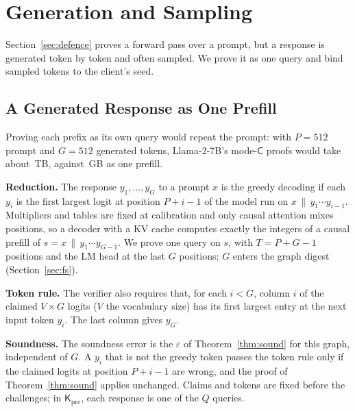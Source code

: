 \providecommand{\Kpre}{\mathsf{K}_{\mathrm{pre}}}
\providecommand{\sC}{\mathsf{C}}
\providecommand{\para}[1]{\par\noindent\textbf{#1}\quad}
\providecommand{\todo}[1]{\textbf{[TODO: #1]}}

\section{Generation and Sampling}
\label{sec:gen}

Section~\ref{sec:defence} proves a forward pass over a prompt, but a response is generated token by
token and often sampled. We prove it as one query and bind sampled tokens to the client's seed.

\subsection{A Generated Response as One Prefill}
\label{sec:gen-prefill}

Proving each prefix as its own query would repeat the prompt: with $P=512$ prompt and $G=512$
generated tokens, Llama-2-7B's mode-$\sC$ proofs would take about \GenPerPrefixTB{}\,TB, against
\GenPrefillGB{}\,GB as one prefill.

\para{Reduction.} The response $y_1,\dots,y_G$ to a prompt $x$ is the greedy decoding if each
$y_i$ is the first largest logit at position $P+i-1$ of the model run on
$x\,\|\,y_1\cdots y_{i-1}$. Multipliers and tables are fixed at calibration and only causal
attention mixes positions, so a decoder with a KV cache computes exactly the integers of a causal
prefill of $s=x\,\|\,y_1\cdots y_{G-1}$. We prove one query on $s$, with $T=P+G-1$ positions and
the LM head at the last $G$ positions; $G$ enters the graph digest (Section~\ref{sec:fs}).

\para{Token rule.} The verifier also requires that, for each $i<G$, column $i$ of the claimed
$V\times G$ logits ($V$ the vocabulary size) has its first largest entry at the next input token
$y_i$. The last column gives $y_G$.

\para{Soundness.} The soundness error is the $\varepsilon$ of Theorem~\ref{thm:sound} for this
graph, independent of $G$. A $y_i$ that is not the greedy token passes the token rule only if the
claimed logits at position $P+i-1$ are wrong, and the proof of Theorem~\ref{thm:sound} applies
unchanged. Claims and tokens are fixed before the challenges; in $\Kpre$, each response is one of
the $Q$ queries.


